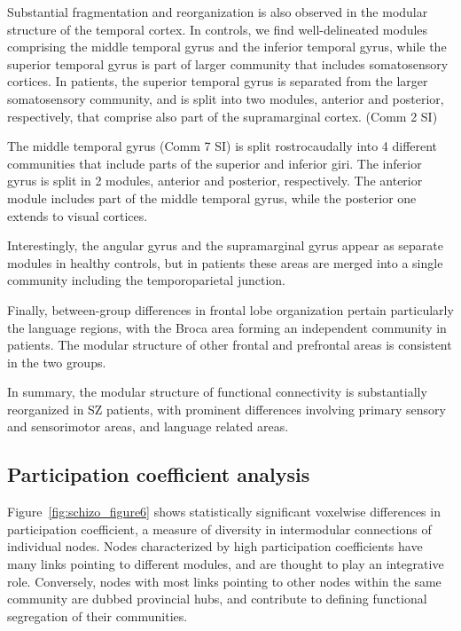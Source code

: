 Substantial fragmentation and reorganization is also observed in the modular structure of the temporal cortex.
In controls, we find well-delineated modules comprising the middle temporal gyrus and the inferior temporal gyrus, while the superior temporal gyrus is part of larger community that includes somatosensory cortices.
In patients, the superior temporal gyrus is separated from the larger somatosensory community, and is split into two modules, anterior and posterior, respectively, that comprise also part of the supramarginal cortex. (Comm 2 SI)

The middle temporal gyrus (Comm 7 SI) is split rostrocaudally into 4 different communities that include parts of the superior and inferior giri.
The inferior gyrus is split in 2 modules, anterior and posterior, respectively.
The anterior module includes part of the middle temporal gyrus, while the posterior one extends to visual cortices. 

Interestingly, the angular gyrus and the supramarginal gyrus appear as separate modules in healthy controls, but in patients these areas are merged into a single community including the temporoparietal junction. 

Finally, between-group differences in frontal lobe organization pertain particularly the language regions, with the Broca area forming an independent community in patients. The modular structure of other frontal and prefrontal areas is consistent in the two groups.

In summary, the modular structure of functional connectivity is substantially reorganized in SZ patients, with prominent differences involving primary sensory and sensorimotor areas, and language related areas. 


\subsection{Participation coefficient analysis}
Figure~\ref{fig:schizo_figure6} shows statistically significant voxelwise differences in participation coefficient, a measure of diversity in intermodular connections of individual nodes.
Nodes characterized by high participation coefficients have many links pointing to different modules, and are thought to play an integrative role. 
Conversely, nodes with most links pointing to other nodes within the same community are dubbed provincial hubs, and contribute to defining functional segregation of their communities.


